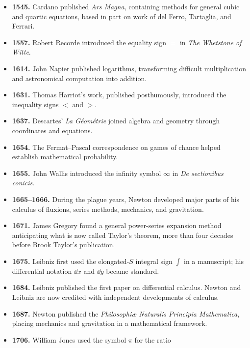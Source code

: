 \begin{itemize}
              centuries before the European calculus.
        \item \textbf{1545.} Cardano published \textit{Ars Magna}, containing
              methods for general cubic and quartic equations, based in part on
              work of del Ferro, Tartaglia, and Ferrari.
        \item \textbf{1557.} Robert Recorde introduced the equality sign
              $=$ in \textit{The Whetstone of Witte}.
        \item \textbf{1614.} John Napier published logarithms, transforming
              difficult multiplication and astronomical computation into
              addition.
        \item \textbf{1631.} Thomas Harriot's work, published posthumously,
              introduced the inequality signs $<$ and $>$.
        \item \textbf{1637.} Descartes' \textit{La Géométrie} joined algebra
              and geometry through coordinates and equations.
        \item \textbf{1654.} The Fermat--Pascal correspondence on games of
              chance helped establish mathematical probability.
        \item \textbf{1655.} John Wallis introduced the infinity symbol
              $\infty$ in \textit{De sectionibus conicis}.
        \item \textbf{1665--1666.} During the plague years, Newton developed
              major parts of his calculus of fluxions, series methods,
              mechanics, and gravitation.
        \item \textbf{1671.} James Gregory found a general power-series
              expansion method anticipating what is now called Taylor's theorem,
              more than four decades before Brook Taylor's publication.
        \item \textbf{1675.} Leibniz first used the elongated-$S$ integral sign
              $\int$ in a manuscript; his differential notation
              $\dd x$ and $\dd y$ became standard.
        \item \textbf{1684.} Leibniz published the first paper on differential
              calculus. Newton and Leibniz are now credited with independent
              developments of calculus.
        \item \textbf{1687.} Newton published the
              \textit{Philosophiæ Naturalis Principia Mathematica}, placing
              mechanics and gravitation in a mathematical framework.
        \item \textbf{1706.} William Jones used the symbol $\pi$ for the ratio

\end{itemize}
